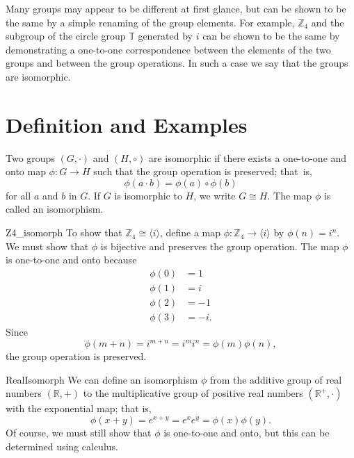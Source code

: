 
Many groups may appear to be different at first glance, but can be shown to be the same by a simple renaming of the group elements.  For example, ${\mathbb Z}_4$ and  the subgroup of the circle group ${\mathbb T}$ generated by $i$ can be shown to be the same by demonstrating a one-to-one correspondence between the elements of the two groups and between the group operations. In such a case we say that the groups are isomorphic.  


\section{Definition and Examples}\label{isomorph_section_1}

Two groups $(G, \cdot)$ and $(H, \circ)$ are {\bfi isomorphic\/} if there exists a one-to-one and onto map $\phi : G \rightarrow H$ such that the group operation is preserved;  that~is, 
\[
\phi( a \cdot b) = \phi( a) \circ \phi( b)
\]
for all $a$ and $b$ in $G$. If $G$ is isomorphic to $H$, we write $G \cong H$\label{noteisomorph}. The map $\phi$ is called an {\bfi isomorphism}. 

\begin{example}{Z4_isomorph}
To show that ${\mathbb Z}_4 \cong \langle i \rangle$, define a map $\phi: {\mathbb Z}_4 \rightarrow \langle i \rangle$ by $\phi(n) = i^n$.  We must show that $\phi$ is bijective and preserves the group operation.  The map $\phi$ is one-to-one and onto because
\begin{align*}
\phi(0) & = 1 \\
\phi(1) & = i \\
\phi(2) & = -1 \\
\phi(3) & = -i.
\end{align*}
Since
\[
\phi(m + n) = i^{m+n} = i^m i^n = \phi(m) \phi( n),
\]
the group operation is preserved.
\end{example}

\begin{example}{RealIsomorph}
We can define an isomorphism $\phi$ from the additive group of real numbers $( {\mathbb R}, + )$ to the multiplicative group of positive real numbers  $( {\mathbb R^+}, \cdot )$  with the exponential map; that is,
\[
\phi( x + y) = e^{x + y} = e^x e^y = \phi( x ) \phi( y).
\]
Of course, we must still show that $\phi$ is one-to-one and onto, but this can be determined using calculus. 
\end{example}

